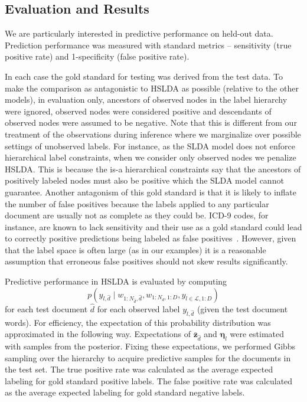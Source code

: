 \subsection{Evaluation and Results}


We are particularly interested in
predictive performance on held-out data. Prediction performance was measured
with standard metrics -- sensitivity (true positive rate) and 1-specificity
(false positive rate). 

In each case the gold standard for testing was derived from the test data. To make the comparison as antagonistic to HSLDA as possible (relative to the other models), in evaluation only, ancestors of
observed nodes in the label hierarchy were ignored, observed nodes were
considered positive and descendants of observed nodes were assumed to be
negative. Note that this is different from our treatment of the observations during inference where we marginalize over possible settings of unobserved labels.
For instance, as the SLDA model does not enforce hierarchical
label constraints, when we consider only observed nodes we penalize HSLDA.  This is because
 the is-a hierarchical constraints say that the ancestors of positively labeled nodes must also be positive which the SLDA model cannot guarantee.
Another antagonism of this gold standard is that it is likely to inflate the number of false positives because
the labels applied to any particular document are usually not as complete as
they could be.  ICD-9 codes, for instance, are known to lack sensitivity and their use as a
gold standard could lead to correctly positive predictions being labeled as
false positives~\cite{Birmetal2005}.
However, given that the label space is often large (as in our examples) it is a
reasonable assumption that erroneous false positives should not skew results
significantly. 

Predictive performance in HSLDA is evaluated by computing
 \[p\left(y_{l,\hat{d}}\mid w_{1:N_{\hat{d}},\hat{d}}, w_{1:N_d,1:D},  y_{l\in\mathcal{L},1:D}\right)\] 
for each test document $\hat{d}$ for each observed label $y_{l,\hat{d}}$ (given the test document words). For efficiency, the expectation of this
probability distribution was approximated in the following way. Expectations 
of $\mathbf{\bar{z}}_{\hat{d}}$ and $\boldsymbol{\eta}_l$ were estimated with samples
from the posterior. Fixing these expectations, we performed Gibbs sampling over
the hierarchy to acquire predictive samples for the documents in the test set.
The true positive rate was calculated as the average expected labeling for
gold standard positive labels. The false positive rate was calculated 
as the average expected labeling for gold standard negative labels.

